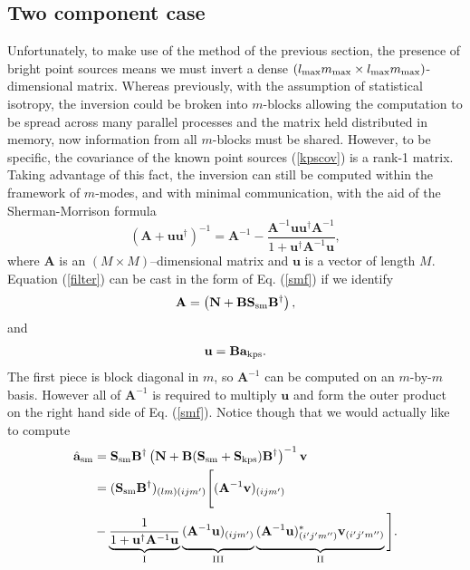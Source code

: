 \subsection{Two component case}
\label{sec:singlecomponent}

Unfortunately, to make use of the method of the previous section, the presence of bright point sources means we must invert a dense $(l_{\rm max}m_{\rm max} \times l_{\rm max}m_{\rm max})$-dimensional matrix. Whereas previously, with the assumption of statistical isotropy, the inversion could be broken into $m$-blocks allowing the computation to be spread across many parallel processes and the matrix held distributed in memory, now information from all $m$-blocks must be shared. However, to be specific, the covariance of the known point sources (\ref{kpscov}) is a rank-1 matrix. Taking advantage of this fact, the inversion can still be computed within the framework of $m$-modes, and with minimal communication, with the aid of the Sherman-Morrison formula \citep{smf1, smf2}
\begin{equation}
(\mathbf{A} + \mathbf{uu}^{\dagger})^{-1} = \mathbf{A}^{-1} - \frac{\mathbf{A}^{-1}\mathbf{u}\mathbf{u}^{\dagger}\mathbf{A}^{-1}}{1+\mathbf{u}^{\dagger}\mathbf{A}^{-1}\mathbf{u}}, \label{smf}
\end{equation}
where $\mathbf{A}$ is an $(M \times M)$--dimensional matrix and $\mathbf{u}$ is a vector of length $M$.
Equation (\ref{filter}) can be cast in the form of Eq. (\ref{smf}) if we identify
\begin{align}
\mathbf{A}  = \left( \mathbf{N} + \mathbf{B}\mathbf{S}_{\rm sm}\mathbf{B}^{\dagger}\right),
\end{align}
and
\begin{align}
\mathbf{u} = \mathbf{B}\mathbf{a}_{\rm kps}.
\end{align}
The first piece is block diagonal in $m$, so $\mathbf{A}^{-1}$ can be computed on an $m$-by-$m$ basis. However all of $\mathbf{A}^{-1}$ is required to multiply $\mathbf{u}$ and form the outer product on the right hand side of Eq. (\ref{smf}). Notice though that we would actually like to compute
\begin{align}
\hat{\mathbf{a}}_{\rm sm} &= \mathbf{S}_{\rm sm}\mathbf{B}^{\dagger}\left( \mathbf{N} + \mathbf{B}(\mathbf{S}_{\rm sm} + \mathbf{S}_{\rm kps})\mathbf{B}^{\dagger}\right)^{-1}\mathbf{v}
\nonumber \\
&= (\mathbf{S}_{\rm sm}\mathbf{B}^{\dagger})_{(lm)(ijm')}
\Bigg[ (\mathbf{A}^{-1}\mathbf{v})_{(ijm')}
\nonumber \\
&- \underbrace{\frac{1}{1+\mathbf{u}^{\dagger}\mathbf{A}^{-1}\mathbf{u}}}_{\text{\RNum{1}}}
 \underbrace{\vphantom{\frac{1}{1+\mathbf{u}^{\dagger}\mathbf{A}^{-1}\mathbf{u}}}(\mathbf{A}^{-1}\mathbf{u})_{(ijm')}}_{\text{\RNum{3}}}
  \underbrace{\vphantom{\frac{1}{1+\mathbf{u}^{\dagger}\mathbf{A}^{-1}\mathbf{u}}}(\mathbf{A}^{-1}\mathbf{u})^*_{(i'j'm'')} \mathbf{v}_{(i'j'm'')}}_{\text{\RNum{2}}}
\Bigg].
\label{expand}
\end{align}
